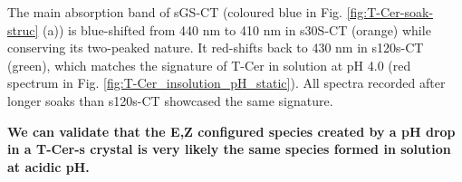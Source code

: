 The main absorption band of sGS-CT (coloured blue in Fig. \ref{fig:T-Cer-soak-struc} (a)) is blue-shifted from 440 nm to 410 nm in s30S-CT (orange) while conserving its two-peaked nature. It red-shifts back to 430 nm in s120s-CT (green), which matches the signature of T-Cer in solution at pH 4.0 (red spectrum in Fig. \ref{fig:T-Cer_insolution_pH_static}). All spectra recorded after longer soaks than s120s-CT showcased the same signature. 

\vspace{2mm}

\textbf{We can validate that the E,Z configured species created by a pH drop in a T-Cer-s crystal is very likely the same species formed in solution at acidic pH. }

\vspace{2mm}

